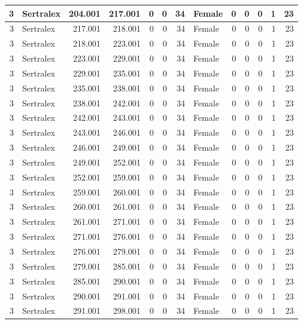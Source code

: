 \documentclass[
]{book}
\begin{document}
\begin{table}
\begin{tabular}[t]{r|l|r|r|r|r|r|l|r|r|r|r|r}
\hline
3 & Sertralex & 204.001 & 217.001 & 0 & 0 & 34 & Female & 0 & 0 & 0 & 1 & 23\\
\hline
3 & Sertralex & 217.001 & 218.001 & 0 & 0 & 34 & Female & 0 & 0 & 0 & 1 & 23\\
\hline
3 & Sertralex & 218.001 & 223.001 & 0 & 0 & 34 & Female & 0 & 0 & 0 & 1 & 23\\
\hline
3 & Sertralex & 223.001 & 229.001 & 0 & 0 & 34 & Female & 0 & 0 & 0 & 1 & 23\\
\hline
3 & Sertralex & 229.001 & 235.001 & 0 & 0 & 34 & Female & 0 & 0 & 0 & 1 & 23\\
\hline
3 & Sertralex & 235.001 & 238.001 & 0 & 0 & 34 & Female & 0 & 0 & 0 & 1 & 23\\
\hline
3 & Sertralex & 238.001 & 242.001 & 0 & 0 & 34 & Female & 0 & 0 & 0 & 1 & 23\\
\hline
3 & Sertralex & 242.001 & 243.001 & 0 & 0 & 34 & Female & 0 & 0 & 0 & 1 & 23\\
\hline
3 & Sertralex & 243.001 & 246.001 & 0 & 0 & 34 & Female & 0 & 0 & 0 & 1 & 23\\
\hline
3 & Sertralex & 246.001 & 249.001 & 0 & 0 & 34 & Female & 0 & 0 & 0 & 1 & 23\\
\hline
3 & Sertralex & 249.001 & 252.001 & 0 & 0 & 34 & Female & 0 & 0 & 0 & 1 & 23\\
\hline
3 & Sertralex & 252.001 & 259.001 & 0 & 0 & 34 & Female & 0 & 0 & 0 & 1 & 23\\
\hline
3 & Sertralex & 259.001 & 260.001 & 0 & 0 & 34 & Female & 0 & 0 & 0 & 1 & 23\\
\hline
3 & Sertralex & 260.001 & 261.001 & 0 & 0 & 34 & Female & 0 & 0 & 0 & 1 & 23\\
\hline
3 & Sertralex & 261.001 & 271.001 & 0 & 0 & 34 & Female & 0 & 0 & 0 & 1 & 23\\
\hline
3 & Sertralex & 271.001 & 276.001 & 0 & 0 & 34 & Female & 0 & 0 & 0 & 1 & 23\\
\hline
3 & Sertralex & 276.001 & 279.001 & 0 & 0 & 34 & Female & 0 & 0 & 0 & 1 & 23\\
\hline
3 & Sertralex & 279.001 & 285.001 & 0 & 0 & 34 & Female & 0 & 0 & 0 & 1 & 23\\
\hline
3 & Sertralex & 285.001 & 290.001 & 0 & 0 & 34 & Female & 0 & 0 & 0 & 1 & 23\\
\hline
3 & Sertralex & 290.001 & 291.001 & 0 & 0 & 34 & Female & 0 & 0 & 0 & 1 & 23\\
\hline
3 & Sertralex & 291.001 & 298.001 & 0 & 0 & 34 & Female & 0 & 0 & 0 & 1 & 23\\

\end{tabular}
\end{table}
\end{document}
